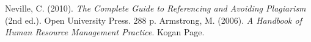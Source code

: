 \begin{thebibliography}{99}
 Neville, C. (2010). \textit{The Complete Guide to Referencing and Avoiding Plagiarism} (2nd ed.). Open University Press. 288 p.
 Armstrong, M. (2006). \textit{A Handbook of Human Resource Management Practice}. Kogan Page.
\end{thebibliography}
